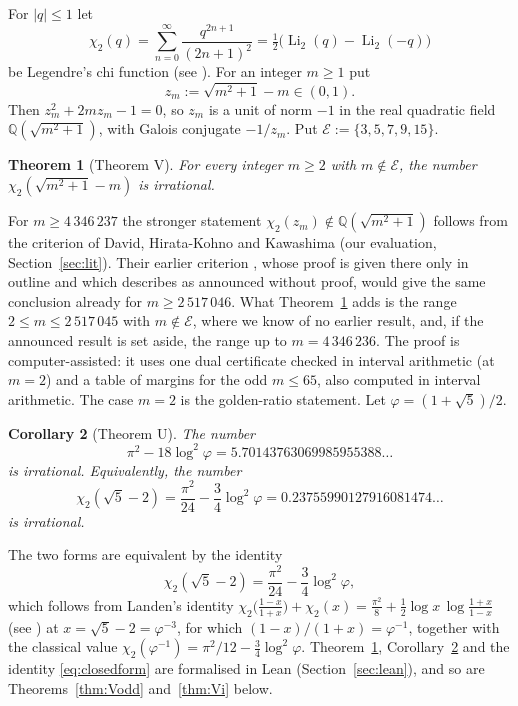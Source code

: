 \documentclass[11pt]{amsart}
\newtheorem{theorem}{Theorem}[section]
\newtheorem{corollary}[theorem]{Corollary}
\theoremstyle{definition}
\theoremstyle{remark}
\numberwithin{equation}{section}
\newcommand{\QQ}{\mathbb{Q}}
\newcommand{\cE}{\mathcal{E}}
\newcommand{\Li}{\operatorname{Li}}
\begin{document}
For $|q|\le1$ let
\[
  \chi_2(q)=\sum_{n=0}^{\infty}\frac{q^{2n+1}}{(2n+1)^2}=\tfrac12\bigl(\Li_2(q)-\Li_2(-q)\bigr)
\]
be Legendre's chi function (see \cite{Lewin1981}). For an integer $m\ge1$ put
\[
  z_m:=\sqrt{m^2+1}-m\in(0,1).
\]
Then $z_m^2+2mz_m-1=0$, so $z_m$ is a unit of norm $-1$ in the real quadratic field $\QQ(\sqrt{m^2+1})$, with
Galois conjugate $-1/z_m$. Put $\cE:=\{3,5,7,9,15\}$.

\begin{theorem}[Theorem V]\label{thm:V}
For every integer $m\ge2$ with $m\notin\cE$, the number $\chi_2(\sqrt{m^2+1}-m)$ is irrational.
\end{theorem}

For $m\ge4\,346\,237$ the stronger statement $\chi_2(z_m)\notin\QQ(\sqrt{m^2+1})$ follows from the criterion of
David, Hirata-Kohno and Kawashima \cite[Thm.~1]{DHK2022b} (our evaluation, Section~\ref{sec:lit}). Their earlier
criterion \cite[Thm.~2.1]{DHK2020}, whose proof is given there only in outline and which \cite[Rem.~1(iii)]{DHK2022b}
describes as announced without proof, would give the same conclusion already for $m\ge2\,517\,046$. What
Theorem~\ref{thm:V} adds is the range $2\le m\le2\,517\,045$ with $m\notin\cE$, where we know of no earlier result,
and, if the announced result is set aside, the range up to $m=4\,346\,236$. The proof is computer-assisted: it uses
one dual certificate checked in interval arithmetic (at $m=2$) and a table of
margins for the odd $m\le65$, also computed in interval arithmetic. The case $m=2$ is the golden-ratio statement. Let
$\varphi=(1+\sqrt5)/2$.

\begin{corollary}[Theorem U]\label{thm:U}
The number
\[
  \pi^2-18\log^2\varphi=5.70143763069985955388\ldots
\]
is irrational. Equivalently, the number
\[
  \chi_2(\sqrt5-2)=\frac{\pi^2}{24}-\frac34\log^2\varphi=0.23755990127916081474\ldots
\]
is irrational.
\end{corollary}

The two forms are equivalent by the identity
\begin{equation}\label{eq:closedform}
  \chi_2(\sqrt5-2)=\frac{\pi^2}{24}-\frac34\log^2\varphi ,
\end{equation}
which follows from Landen's identity
$\chi_2\bigl(\tfrac{1-x}{1+x}\bigr)+\chi_2(x)=\tfrac{\pi^2}{8}+\tfrac12\log x\,\log\tfrac{1+x}{1-x}$
(see \cite{Lewin1981}) at $x=\sqrt5-2=\varphi^{-3}$, for which $(1-x)/(1+x)=\varphi^{-1}$, together with the
classical value $\chi_2(\varphi^{-1})=\pi^2/12-\frac34\log^2\varphi$. Theorem~\ref{thm:V}, Corollary~\ref{thm:U} and the identity
\eqref{eq:closedform} are formalised in Lean (Section~\ref{sec:lean}), and so are Theorems~\ref{thm:Vodd}
and~\ref{thm:Vi} below.
\end{document}
